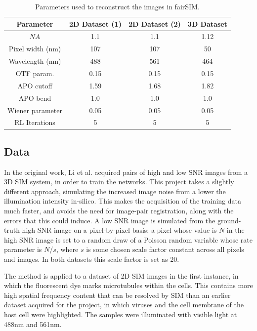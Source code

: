 \documentclass[12pt]{article}
\newcommand\NA{\mathit{NA}}
\begin{document}
\begin{table}[htp]
    \centering
    \begin{tabular}{| c | c | c | c |}
        \hline
        Parameter & 2D Dataset (1) & 2D Dataset (2) & 3D Dataset \\
        \hline
        $\NA$  & 1.1 & 1.1 & 1.12 \\
        \hline
        Pixel width (nm) & 107 & 107 & 50 \\
        \hline
        Wavelength (nm) & 488 & 561 & 464 \\
        \hline
        OTF param.  & 0.15 & 0.15 & 0.15 \\
        \hline
        APO cutoff & 1.59 & 1.68 & 1.82 \\
        \hline
        APO bend  & 1.0 & 1.0 & 1.0 \\
        \hline
        Wiener parameter & 0.05 & 0.05 & 0.05 \\
        \hline
        RL Iterations & 5 & 5 & 5\\
        \hline

    \end{tabular}
    \caption{Parameters used to reconstruct the images in fairSIM.}
    \label{tab:reconparams}
\end{table}

\subsection{Data}

In the original work, Li et al. acquired pairs of high and low SNR images from a 3D SIM system,
in order to train the networks.
This project takes a slightly different approach,
simulating the increased image noise from a lower the illumination intensity in-silico.
This makes the acquisition of the training data much faster,
and avoids the need for image-pair registration, along with the errors that this could induce.
A low SNR image is simulated from the ground-truth high SNR image on a pixel-by-pixel basis:
a pixel whose value is $N$ in the high SNR image is set to a random draw of a Poisson random variable whose rate parameter is $N$/$s$,
where $s$ is some chosen scale factor constant across all pixels and images.
In both datasets this scale factor is set as 20.

The method is applied to a dataset of 2D SIM images in the first instance,
in which the fluorescent dye marks microtubules within the cells.
This contains more high spatial frequency content that can be resolved by SIM than an earlier dataset acquired for the project,
in which viruses and the cell membrane of the host cell were highlighted.
The samples were illuminated with visible light at 488nm and 561nm.
\end{document}
